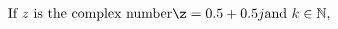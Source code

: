 \documentclass[preview]{standalone}
\begin{document}
\begin{align*}
\text{If } z \text{ is the complex number} \z = 0.5 + 0.5j \text{and $k \in \mathbb{N}$, }
\end{align*}
\end{document}

